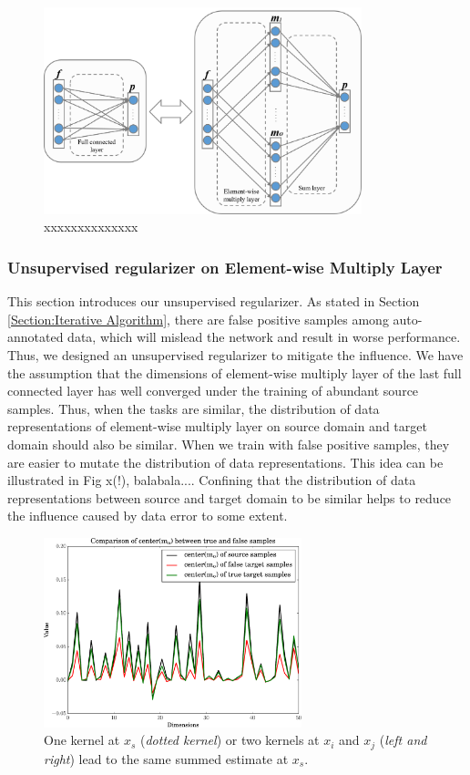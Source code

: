 \documentclass[runningheads]{llncs}
\begin{document}
\begin{figure}
\centering
\includegraphics[height=6cm]{images/elementwiselayer.png}
\caption{xxxxxxxxxxxxxx}
\label{fig:elementwiselayer}
\end{figure}

\subsubsection{Unsupervised regularizer on Element-wise Multiply Layer}

This section introduces our unsupervised regularizer. As stated in Section \ref{Section:Iterative Algorithm}, there are false positive samples among auto-annotated data, which will mislead the network and result in worse performance. Thus, we designed an unsupervised regularizer to mitigate the influence. We have the assumption that the dimensions of element-wise multiply layer of the last full connected layer has well converged under the training of abundant source samples. Thus, when the tasks are similar, the distribution of data representations of element-wise multiply layer on source domain and target domain should also be similar. When we train with false positive samples, they are easier to mutate the distribution of data representations. This idea can be illustrated in Fig x(!), balabala.... Confining that the distribution of data representations between source and target domain to be similar helps to reduce the influence caused by data error to some extent.

\begin{figure}
\centering
\includegraphics[height=5.5cm]{images/mmd.pdf}
\caption{One kernel at $x_s$ ({\it dotted kernel}) or two kernels at
$x_i$ and $x_j$ ({\it left and right}) lead to the same summed estimate
at $x_s$. }
\label{fig:example}
\end{figure}
\end{document}
